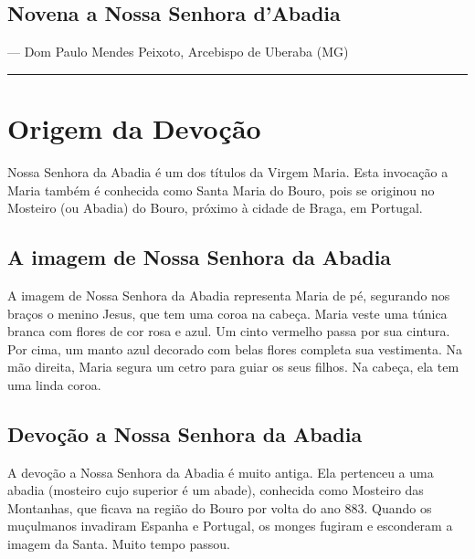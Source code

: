 \documentclass[a4paper,14pt]{extarticle} \usepackage[utf8]{inputenc}
\begin{document}
\subsection*{Novena a Nossa Senhora d'Abadia}


--- Dom Paulo Mendes Peixoto, Arcebispo de Uberaba (MG)

\par\noindent\rule{\textwidth}{0.4pt}

\tableofcontents
\thispagestyle{empty}

\newpage

\section{Origem da Devoção}

Nossa Senhora da Abadia é um dos títulos da Virgem Maria. Esta invocação a Maria também é conhecida como Santa Maria do Bouro, pois se originou no Mosteiro (ou Abadia) do Bouro, próximo à cidade de Braga, em Portugal.

\subsection{A imagem de Nossa Senhora da Abadia}

A imagem de Nossa Senhora da Abadia representa Maria de pé, segurando nos braços o menino Jesus, que tem uma coroa na cabeça. Maria veste uma túnica branca com flores de cor rosa e azul. Um cinto vermelho passa por sua cintura. Por cima, um manto azul decorado com belas flores completa sua vestimenta. Na mão direita, Maria segura um cetro para guiar os seus filhos. Na cabeça, ela tem uma linda coroa.

\subsection{Devoção a Nossa Senhora da Abadia}

A devoção a Nossa Senhora da Abadia é muito antiga. Ela pertenceu a uma abadia (mosteiro cujo superior é um abade), conhecida como Mosteiro das Montanhas, que ficava na região do Bouro por volta do ano 883. Quando os muçulmanos invadiram Espanha e Portugal, os monges fugiram e esconderam a imagem da Santa. Muito tempo passou.
\end{document}
